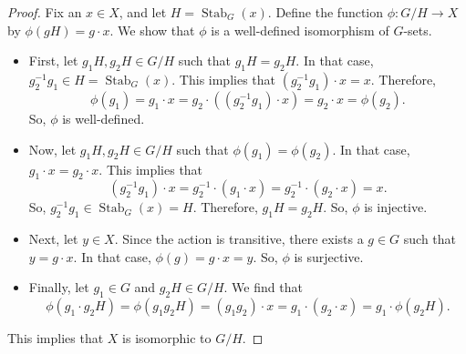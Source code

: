 \documentclass[a4paper, openany]{memoir}
\theoremstyle{definition}
\theoremstyle{plain}
\begin{document}
\begin{proof}
Fix an $x \in X$, and let $H = \operatorname{Stab}_G(x)$. Define the function $\phi: G/H \to X$ by $\phi(gH) = g \cdot x$. We show that $\phi$ is a well-defined isomorphism of $G$-sets.
\begin{itemize}
    \item First, let $g_1H, g_2H \in G/H$ such that $g_1H = g_2H$. In that case, $g_2^{-1}g_1 \in H = \operatorname{Stab}_G(x)$. This implies that $(g_2^{-1} g_1) \cdot x = x$. Therefore,
    \[\phi(g_1) = g_1 \cdot x = g_2 \cdot ((g_2^{-1}g_1) \cdot x) = g_2 \cdot x = \phi(g_2).\]
    So, $\phi$ is well-defined.
    
    \item Now, let $g_1H, g_2H \in G/H$ such that $\phi(g_1) = \phi(g_2)$. In that case, $g_1 \cdot x = g_2 \cdot x$. This implies that
    \[(g_2^{-1}g_1) \cdot x = g_2^{-1} \cdot (g_1 \cdot x) = g_2^{-1} \cdot (g_2 \cdot x) = x.\]
    So, $g_2^{-1}g_1 \in \operatorname{Stab}_G(x) = H$. Therefore, $g_1H = g_2H$. So, $\phi$ is injective.
    
    \item Next, let $y \in X$. Since the action is transitive, there exists a $g \in G$ such that $y = g \cdot x$. In that case, $\phi(g) = g \cdot x = y$. So, $\phi$ is surjective.
    
    \item Finally, let $g_1 \in G$ and $g_2H \in G/H$. We find that
    \[\phi(g_1 \cdot g_2H) = \phi(g_1g_2H) = (g_1g_2) \cdot x = g_1 \cdot (g_2 \cdot x) = g_1 \cdot \phi(g_2H).\]
\end{itemize}
This implies that $X$ is isomorphic to $G/H$.
\end{proof}
\end{document}
